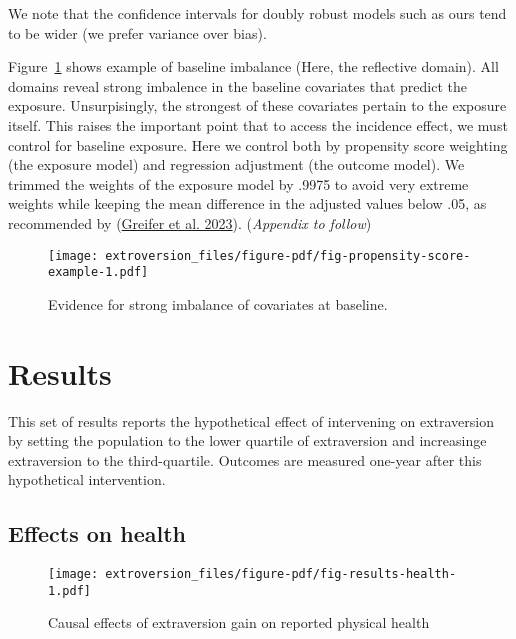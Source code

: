 \documentclass[
  singlecolumn]{report}
\begin{document}
We note that the confidence intervals for doubly robust models such as
ours tend to be wider (we prefer variance over bias).

Figure~\ref{fig-propensity-score-example} shows example of baseline
imbalance (Here, the reflective domain). All domains reveal strong
imbalence in the baseline covariates that predict the exposure.
Unsurpisingly, the strongest of these covariates pertain to the exposure
itself. This raises the important point that to access the incidence
effect, we must control for baseline exposure. Here we control both by
propensity score weighting (the exposure model) and regression
adjustment (the outcome model). We trimmed the weights of the exposure
model by .9975 to avoid very extreme weights while keeping the mean
difference in the adjusted values below .05, as recommended by
(\protect\hyperlink{ref-greifer2023}{Greifer et al. 2023}).
(\emph{Appendix to follow})

\begin{figure}

{\centering \texttt{[image: extroversion\_files/figure-pdf/fig-propensity-score-example-1.pdf]}

}

\caption{\label{fig-propensity-score-example}Evidence for strong
imbalance of covariates at baseline.}

\end{figure}

\hypertarget{results}{%
\section{Results}\label{results}}

This set of results reports the hypothetical effect of intervening on
extraversion by setting the population to the lower quartile of
extraversion and increasinge extraversion to the third-quartile.
Outcomes are measured one-year after this hypothetical intervention.

\hypertarget{effects-on-health}{%
\subsection{Effects on health}\label{effects-on-health}}

\begin{figure}

{\centering \texttt{[image: extroversion\_files/figure-pdf/fig-results-health-1.pdf]}

}

\caption{\label{fig-results-health}Causal effects of extraversion gain
on reported physical health}

\end{figure}
\end{document}
